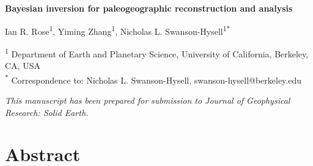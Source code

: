 \documentclass[11pt,letterpaper]{article}
\begin{document}
\begin{flushleft}
{\Large \textbf{Bayesian inversion for paleogeographic reconstruction and analysis}}

Ian R. Rose\textsuperscript{1},
Yiming Zhang\textsuperscript{1},
Nicholas L. Swanson-Hysell\textsuperscript{1}\textsuperscript{*}

\bigskip
\textsuperscript{1} Department of Earth and Planetary Science, University of California, Berkeley, CA, USA\\
\textsuperscript{*} Correspondence to: Nicholas L. Swanson-Hysell, swanson-hysell@berkeley.edu
\bigskip

\end{flushleft}

\noindent\textit{This manuscript has been prepared for submission to Journal of Geophysical Research: Solid Earth.}

\linenumbers

\section*{Abstract \label{sec:ABSTRACT}}
\end{document}

